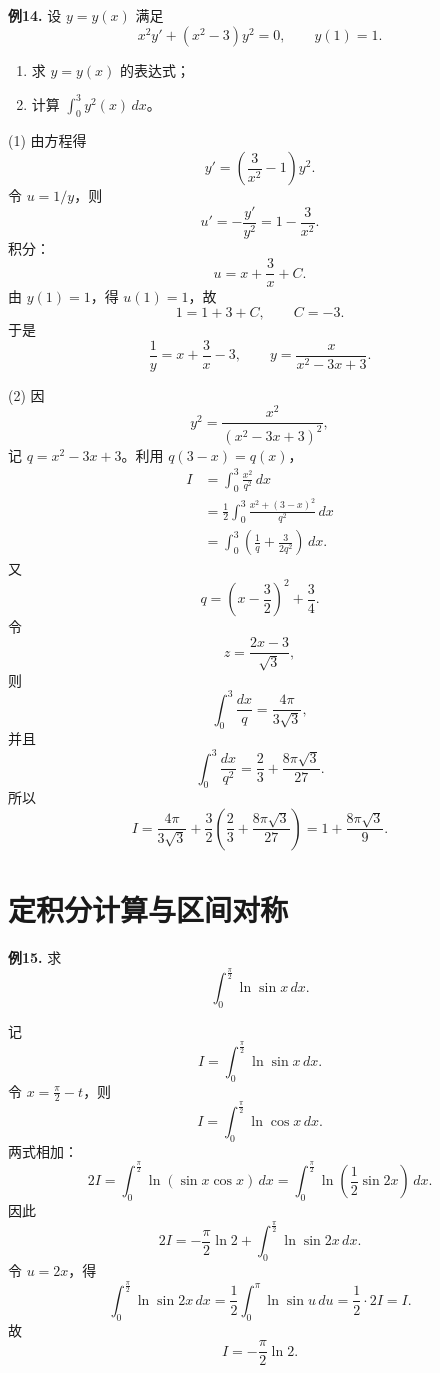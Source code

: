 \begin{problemblock}
\textbf{例14.} 设 \(y=y(x)\) 满足
\[
x^2y'+(x^2-3)y^2=0,\qquad y(1)=1.
\]
\begin{enumerate}[label=(\arabic*), leftmargin=2.2em]
\item 求 \(y=y(x)\) 的表达式；
\item 计算 \(\displaystyle\int_0^3y^2(x)\,dx\)。
\end{enumerate}
\end{problemblock}
\begin{solutionblock}
(1) 由方程得
\[
y'=\left(\frac3{x^2}-1\right)y^2.
\]
令 \(u=1/y\)，则
\[
u'=-\frac{y'}{y^2}=1-\frac3{x^2}.
\]
积分：
\[
u=x+\frac3x+C.
\]
由 \(y(1)=1\)，得 \(u(1)=1\)，故
\[
1=1+3+C,\qquad C=-3.
\]
于是
\[
\frac1y=x+\frac3x-3,
\qquad
y=\frac{x}{x^2-3x+3}.
\]

(2) 因
\[
y^2=\frac{x^2}{(x^2-3x+3)^2},
\]
记 \(q=x^2-3x+3\)。利用 \(q(3-x)=q(x)\)，
\[
\begin{aligned}
I&=\int_0^3\frac{x^2}{q^2}\,dx\\
&=\frac12\int_0^3
\frac{x^2+(3-x)^2}{q^2}\,dx\\
&=\int_0^3\left(\frac1q+\frac{3}{2q^2}\right)\,dx.
\end{aligned}
\]
又
\[
q=\left(x-\frac32\right)^2+\frac34.
\]
令
\[
z=\frac{2x-3}{\sqrt3},
\]
则
\[
\int_0^3\frac{dx}{q}=\frac{4\pi}{3\sqrt3},
\]
并且
\[
\int_0^3\frac{dx}{q^2}
=\frac23+\frac{8\pi\sqrt3}{27}.
\]
所以
\[
I=\frac{4\pi}{3\sqrt3}
+\frac32\left(\frac23+\frac{8\pi\sqrt3}{27}\right)
=1+\frac{8\pi\sqrt3}{9}.
\]
\end{solutionblock}

\section{定积分计算与区间对称}

\begin{problemblock}
\textbf{例15.} 求
\[
\int_0^{\frac\pi2}\ln\sin x\,dx.
\]
\end{problemblock}
\begin{solutionblock}
记
\[
I=\int_0^{\frac\pi2}\ln\sin x\,dx.
\]
令 \(x=\frac\pi2-t\)，则
\[
I=\int_0^{\frac\pi2}\ln\cos x\,dx.
\]
两式相加：
\[
2I=\int_0^{\frac\pi2}\ln(\sin x\cos x)\,dx
=\int_0^{\frac\pi2}\ln\left(\frac12\sin2x\right)\,dx.
\]
因此
\[
2I=-\frac\pi2\ln2+\int_0^{\frac\pi2}\ln\sin2x\,dx.
\]
令 \(u=2x\)，得
\[
\int_0^{\frac\pi2}\ln\sin2x\,dx
=\frac12\int_0^\pi\ln\sin u\,du
=\frac12\cdot2I=I.
\]
故
\[
I=-\frac\pi2\ln2.
\]
\end{solutionblock}

